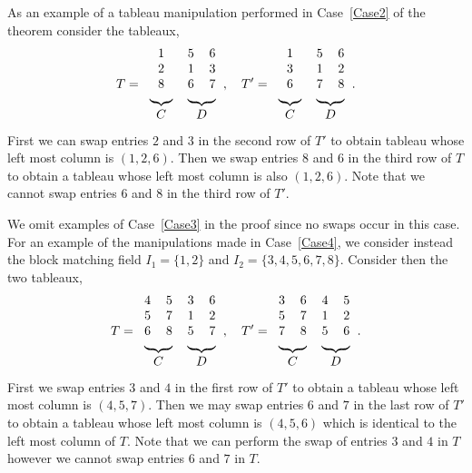\documentclass[ALCO,ThmDefs,Unicode,epreuves]{cedram}
\begin{document}
\begin{exam}
As an example of a tableau manipulation performed in Case~\ref{Case2} of the theorem consider the tableaux, 
\[
T = 
\begin{tabular}{ccc}
 1 & 5 & 6 \\
 2 & 1 & 3 \\
 8 & 6 & 7 \\
 \multicolumn{1}{c}{\upbracefill} & \multicolumn{2}{c}{\upbracefill}\\
 \multicolumn{1}{c}{$C$} & \multicolumn{2}{c}{$D$}\\
\end{tabular},
\quad
T' = 
\begin{tabular}{ccc}
 1 & 5 & 6 \\
 3 & 1 & 2 \\
 6 & 7 & 8 \\
 \multicolumn{1}{c}{\upbracefill} & \multicolumn{2}{c}{\upbracefill}\\
 \multicolumn{1}{c}{$C$} & \multicolumn{2}{c}{$D$}\\
\end{tabular}.
\]
First we can swap entries $2$ and $3$ in the second row of $T'$ to obtain tableau whose left most column is $(1,2,6)$. Then we swap entries $8$ and $6$ in the third row of $T$ to obtain a tableau whose left most column is also $(1,2,6)$. Note that we cannot swap entries $6$ and $8$ in the third row of $T'$.

\medskip
We omit examples of Case~\ref{Case3} in the proof since no swaps occur in this case. For an example of the manipulations made in Case~\ref{Case4}, we consider instead the block matching field 
$I_1 = \{1, 2\}$ and $I_2 = \{3,4,5,6,7,8 \}$. Consider then the two tableaux, 
\[
T = 
\begin{tabular}{cccc}
 4 & 5 & 3 & 6 \\
 5 & 7 & 1 & 2 \\
 6 & 8 & 5 & 7 \\
 \multicolumn{2}{c}{\upbracefill} & \multicolumn{2}{c}{\upbracefill}\\
 \multicolumn{2}{c}{$C$} & \multicolumn{2}{c}{$D$}\\
\end{tabular},
\quad
T' = 
\begin{tabular}{cccc}
 3 & 6 & 4 & 5 \\
 5 & 7 & 1 & 2 \\
 7 & 8 & 5 & 6 \\
 \multicolumn{2}{c}{\upbracefill} & \multicolumn{2}{c}{\upbracefill}\\
 \multicolumn{2}{c}{$C$} & \multicolumn{2}{c}{$D$}\\
\end{tabular}.
\]
First we swap entries $3$ and $4$ in the first row of $T'$ to obtain a tableau whose left most column is $(4,5,7)$. Then we may swap entries $6$ and $7$ in the last row of $T'$ to obtain a tableau whose left most column is $(4,5,6)$ which is identical to the left most column of $T$. Note that we can perform the swap of entries $3$ and $4$ in $T$ however we cannot swap entries $6$ and $7$ in $T$. 

\end{exam}
\end{document}
